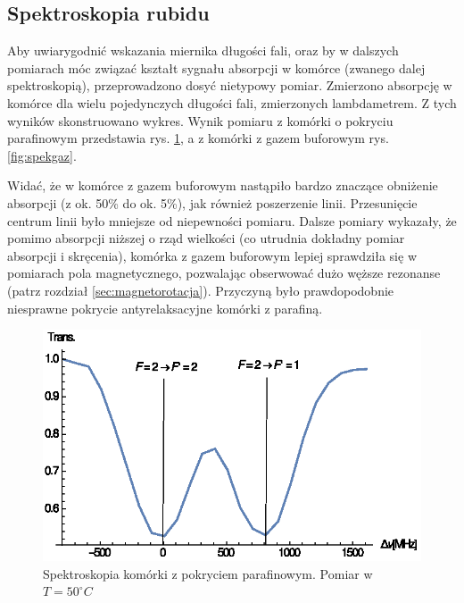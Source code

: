\documentclass[a4paper,10pt]{article}
\begin{document}
\subsection{Spektroskopia rubidu}

Aby uwiarygodnić wskazania miernika długości fali, oraz by w dalszych pomiarach móc związać kształt sygnału absorpcji w komórce (zwanego dalej spektroskopią), przeprowadzono dosyć nietypowy pomiar.
Zmierzono absorpcję w komórce dla wielu pojedynczych długości fali, zmierzonych lambdametrem. Z tych wyników skonstruowano wykres.
Wynik pomiaru z komórki o pokryciu parafinowym przedstawia rys. \ref{fig:spekpara}, a z komórki z gazem buforowym rys. \ref{fig:spekgaz}.

Widać, że w komórce z gazem buforowym nastąpiło bardzo znaczące obniżenie absorpcji (z ok. 50\% do ok. 5\%), jak również poszerzenie linii. Przesunięcie centrum linii było mniejsze od niepewności pomiaru. Dalsze pomiary wykazały, że pomimo absorpcji niższej o rząd wielkości (co utrudnia dokładny pomiar absorpcji i skręcenia), komórka z gazem buforowym lepiej sprawdziła się w pomiarach pola magnetycznego, pozwalając obserwować dużo węższe rezonanse (patrz rozdział \ref{sec:magnetorotacja}). Przyczyną było prawdopodobnie niesprawne pokrycie antyrelaksacyjne komórki z parafiną.


\begin{figure}[h!]
\centering
 \includegraphics[width=\textwidth]{spek_para.eps}
 \caption{Spektroskopia komórki z pokryciem parafinowym. Pomiar w $T=50^{\circ}C$}
 \label{fig:spekpara}
\end{figure}
\end{document}
